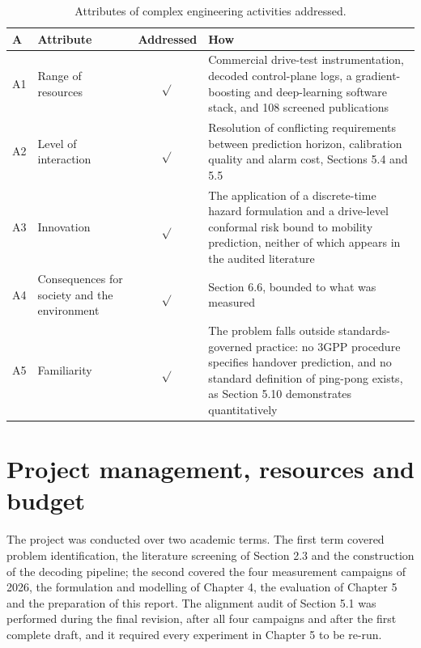 \begin{table}[H]
\centering
\caption{Attributes of complex engineering activities addressed.}
\label{tab:6_5}
\vspace{0.4em}
\singlespacing
\small
\begin{tabularx}{\linewidth}{l >{\raggedright\arraybackslash}p{4.0cm} c X}
\toprule
\textbf{A} & \textbf{Attribute} & \textbf{Addressed} & \textbf{How} \\
\midrule
A1 & Range of resources & $\sqrt{}$ & Commercial drive-test instrumentation, decoded control-plane logs, a gradient-boosting and deep-learning software stack, and 108 screened publications \\
A2 & Level of interaction & $\sqrt{}$ & Resolution of conflicting requirements between prediction horizon, calibration quality and alarm cost, Sections 5.4 and 5.5 \\
A3 & Innovation & $\sqrt{}$ & The application of a discrete-time hazard formulation and a drive-level conformal risk bound to mobility prediction, neither of which appears in the audited literature \\
A4 & Consequences for society and the environment & $\sqrt{}$ & Section 6.6, bounded to what was measured \\
A5 & Familiarity & $\sqrt{}$ & The problem falls outside standards-governed practice: no 3GPP procedure specifies handover prediction, and no standard definition of ping-pong exists, as Section 5.10 demonstrates quantitatively \\
\bottomrule
\end{tabularx}
\end{table}


\section{Project management, resources and budget}
\label{sec:6_9}

The project was conducted over two academic terms. The first term covered problem identification, the literature screening of Section 2.3 and the construction of the decoding pipeline; the second covered the four measurement campaigns of 2026, the formulation and modelling of Chapter 4, the evaluation of Chapter 5 and the preparation of this report. The alignment audit of Section 5.1 was performed during the final revision, after all four campaigns and after the first complete draft, and it required every experiment in Chapter 5 to be re-run.


